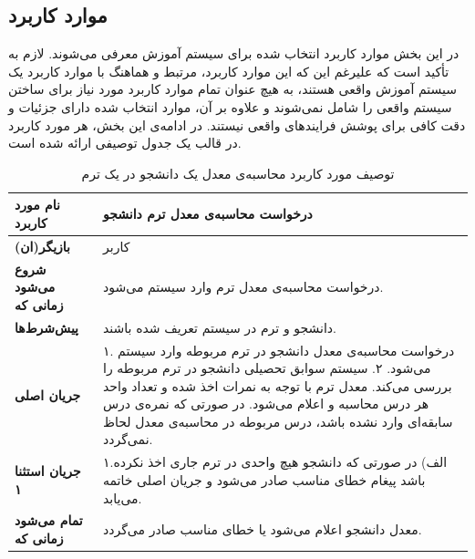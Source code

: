 \subsection{موارد کاربرد}
در این بخش موارد کاربرد انتخاب شده برای سیستم آموزش معرفی می‌شوند. لازم به تأکید است که علیرغم این که این موارد کاربرد، مرتبط و هماهنگ با موارد کاربرد یک سیستم آموزش واقعی هستند، به هیچ عنوان تمام موارد کاربرد مورد نیاز برای ساختن سیستم واقعی را شامل نمی‌شوند و علاوه‌ بر آن، موارد انتخاب شده دارای جزئیات و دقت کافی برای پوشش فرایند‌های واقعی نیستند. در ادامه‌ی این بخش، هر \gls{مورد کاربرد} در قالب یک جدول توصیفی ارائه شده‌ است.


\begin{table}
\begin{center}
\begin{tabular}{|p{5cm}|p{10cm}|}
	\hline
	\textbf{نام مورد کاربرد} &
درخواست محاسبه‌ی معدل ترم دانشجو\\
	\hline
	\textbf{بازیگر(ان)} &
کاربر\\
	\hline
	\textbf{شروع می‌شود زمانی که} &
درخواست محاسبه‌ی معدل ترم وارد سیستم می‌شود.\\
	\hline
	\textbf{پیش‌شرط‌ها} &
دانشجو و ترم در سیستم تعریف شده باشند.\\
	\hline
	\textbf{جریان اصلی} &
۱. درخواست محاسبه‌ی معدل دانشجو در ترم مربوطه وارد سیستم می‌شود.\newline
۲. سیستم سوابق تحصیلی دانشجو در ترم مربوطه را بررسی ‌می‌کند. معدل ترم با توجه به نمرات اخذ شده و تعداد واحد هر درس محاسبه و اعلام می‌شود. در صورتی که نمره‌ی درس سابقه‌ای وارد نشده باشد، درس مربوطه در محاسبه‌ی معدل لحاظ نمی‌گردد.\\
	\hline
\textbf{جریان استثنا ۱} &
۱.الف) در صورتی که دانشجو هیچ واحدی در ترم جاری اخذ نکرده باشد پیغام خطای مناسب صادر می‌شود و جریان اصلی خاتمه می‌یابد.\\
	\hline
	\textbf{تمام می‌شود زمانی که} &
معدل دانشجو اعلام می‌شود یا خطای مناسب صادر می‌گردد.\\
	\hline
\end{tabular}
\caption{\label{table:uc_gpa} توصیف مورد کاربرد محاسبه‌ی معدل یک دانشجو در یک ترم}
\end{center}
\end{table}

